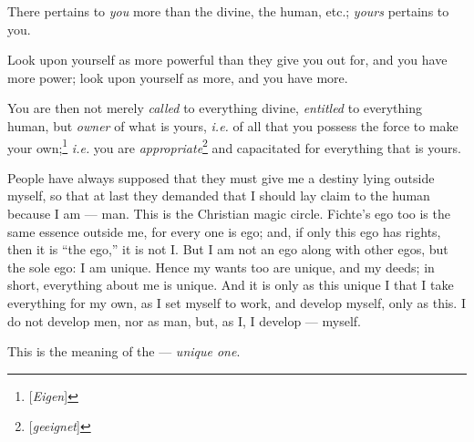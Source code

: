 There pertains to \textit{you} more than the divine, the human, etc.; 
\textit{yours} pertains to you.

Look upon yourself as more powerful than they give you out for, and you have 
more power; look upon yourself as more, and you have more.

You are then not merely \textit{called} to everything divine, 
\textit{entitled} to everything human, but \textit{owner} of what is yours, 
\textit{i.e.} of all that you possess the force to make your 
own;\footnote{[\textit{Eigen}]} \textit{i.e.} you are 
\textit{appropriate}\footnote{[\textit{geeignet}]} and capacitated for 
everything that is yours.

People have always supposed that they must give me a destiny lying outside 
myself, so that at last they demanded that I should lay claim to the human 
because I am --- man. This is the Christian magic circle. Fichte's ego too is 
the same essence outside me, for every one is ego; and, if only this ego has 
rights, then it is ``the ego,'' it is not I. But I am not an ego along with 
other egos, but the sole ego: I am unique. Hence my wants too are unique, and 
my deeds; in short, everything about me is unique. And it is only as this 
unique I that I take everything for my own, as I set myself to work, and 
develop myself, only as this. I do not develop men, nor as man, but, as I, I 
develop --- myself.

This is the meaning of the --- \textit{unique one}.

